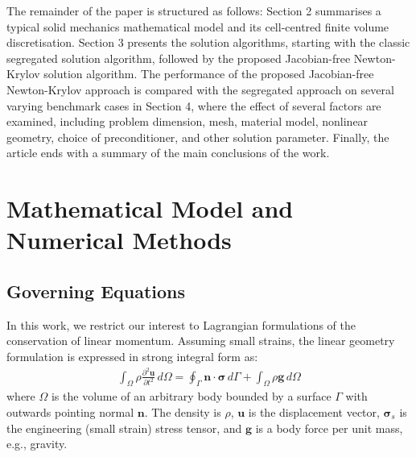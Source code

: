 \documentclass[sn-mathphys,Numbered]{sn-jnl}%
\newcommand{\bb}{\boldsymbol}
\begin{document}
The remainder of the paper is structured as follows:
Section 2 summarises a typical solid mechanics mathematical model and its cell-centred finite volume discretisation.
Section 3 presents the solution algorithms, starting with the classic segregated solution algorithm, followed by the proposed Jacobian-free Newton-Krylov solution algorithm.
The performance of the proposed Jacobian-free Newton-Krylov approach is compared with the segregated approach on several varying benchmark cases in Section 4, where the effect of several factors are examined, including problem dimension, mesh, material model, nonlinear geometry, choice of preconditioner, and other solution parameter.
Finally, the article ends with a summary of the main conclusions of the work.


\section{Mathematical Model and Numerical Methods}\label{sec:math_model}

%

\subsection{Governing Equations} \label{sec:governing_eqn}

In this work, we restrict our interest to Lagrangian formulations of the conservation of linear momentum.
Assuming small strains, the linear geometry formulation is expressed in strong integral form as:
\begin{eqnarray} \label{eqn:momentum_lingeom}
    \int_{\Omega} \rho \frac{\partial^2 \bb{u} }{\partial t^2} \, d\Omega
    =
    \oint_{\Gamma} \bb{n} \cdot \bb{\sigma} \,  d\Gamma
    + \int_{\Omega}  \rho \bb{g} \, d\Omega
\end{eqnarray}
where $\Omega$ is the volume of an arbitrary body bounded by a surface $\Gamma$ with outwards pointing normal $\bb{n}$.
The density is $\rho$, $\bb{u}$ is the displacement vector, $\bb{\sigma}_s$ is the engineering (small strain) stress tensor, and $\bb{g}$ is a body force per unit mass, e.g., gravity.
\end{document}
